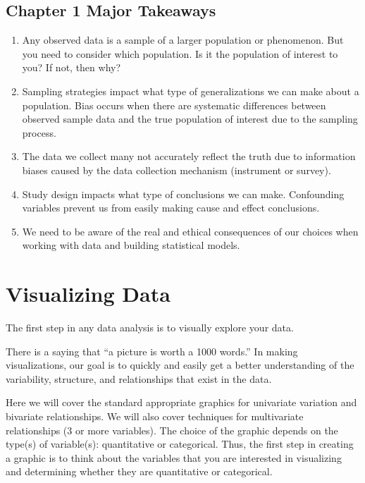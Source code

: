 \documentclass[
]{book}
\begin{document}
\hypertarget{chapter-1-major-takeaways}{%
\section{Chapter 1 Major Takeaways}\label{chapter-1-major-takeaways}}

\begin{enumerate}
\def\labelenumi{\arabic{enumi}.}
\item
  Any observed data is a sample of a larger population or phenomenon. But you need to consider which population. Is it the population of interest to you? If not, then why?
\item
  Sampling strategies impact what type of generalizations we can make about a population. Bias occurs when there are systematic differences between observed sample data and the true population of interest due to the sampling process.
\item
  The data we collect many not accurately reflect the truth due to information biases caused by the data collection mechanism (instrument or survey).
\item
  Study design impacts what type of conclusions we can make. Confounding variables prevent us from easily making cause and effect conclusions.
\item
  We need to be aware of the real and ethical consequences of our choices when working with data and building statistical models.
\end{enumerate}

\hypertarget{visualizing-data}{%
\chapter{Visualizing Data}\label{visualizing-data}}

The first step in any data analysis is to visually explore your data.

There is a saying that ``a picture is worth a 1000 words.'' In making visualizations, our goal is to quickly and easily get a better understanding of the variability, structure, and relationships that exist in the data.

Here we will cover the standard appropriate graphics for univariate variation and bivariate relationships. We will also cover techniques for multivariate relationships (3 or more variables). The choice of the graphic depends on the type(s) of variable(s): quantitative or categorical. Thus, the first step in creating a graphic is to think about the variables that you are interested in visualizing and determining whether they are quantitative or categorical.
\end{document}
